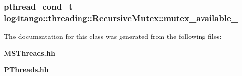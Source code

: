 \subsubsection[{mutex\-\_\-available\-\_\-}]{\setlength{\rightskip}{0pt plus 5cm}pthread\-\_\-cond\-\_\-t log4tango\-::threading\-::\-Recursive\-Mutex\-::mutex\-\_\-available\-\_\-\hspace{0.3cm}{\ttfamily [protected]}}\label{classlog4tango_1_1threading_1_1RecursiveMutex_abafc328ab69204599821730c657c3cba}


The documentation for this class was generated from the following files\-:\begin{DoxyCompactItemize}
\item 
{\bf M\-S\-Threads.\-hh}\item 
{\bf P\-Threads.\-hh}\end{DoxyCompactItemize}
